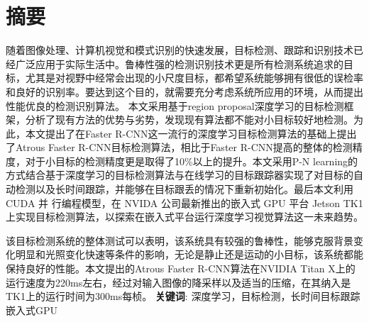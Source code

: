 \newpage
{}



\chapter*{摘要}

随着图像处理、计算机视觉和模式识别的快速发展，目标检测、跟踪和识别技术已经广泛应用于实际生活中。鲁棒性强的检测识别技术更是所有检测系统追求的目标，尤其是对视野中经常会出现的小尺度目标，都希望系统能够拥有很低的误检率和良好的识别率。要达到这个目的，就需要充分考虑系统所应用的环境，从而提出性能优良的检测识别算法。
本文采用基于region proposal深度学习的目标检测框架，分析了现有方法的优势与劣势，发现现有算法都不能对小目标较好地检测。为此，本文提出了在Faster R-CNN这一流行的深度学习目标检测算法的基础上提出了Atrous Faster R-CNN目标检测算法，相比于Faster R-CNN提高的整体的检测精度，对于小目标的检测精度更是取得了10\%以上的提升。本文采用P-N learning的方式结合基于深度学习的目标检测算法与在线学习的目标跟踪器实现了对目标的自动检测以及长时间跟踪，并能够在目标跟丢的情况下重新初始化。最后本文利用CUDA 并 行编程模型，在 NVIDA 公司最新推出的嵌入式 GPU 平台 Jetson TK1 上实现目标检测算法，以探索在嵌入式平台运行深度学习视觉算法这一未来趋势。

该目标检测系统的整体测试可以表明，该系统具有较强的鲁棒性，能够克服背景变化明显和光照变化快速等条件的影响，无论是静止还是运动的小目标，该系统都能保持良好的性能。本文提出的Atrous Faster R-CNN算法在NVIDIA Titan X上的运行速度为220ms左右，经过对输入图像的降采样以及适当的压缩，在其纳入是TK1上的运行时间为300ms每桢。
\vskip 0.3cm \textbf{关键词}: 深度学习，目标检测，长时间目标跟踪 嵌入式GPU
\newpage
